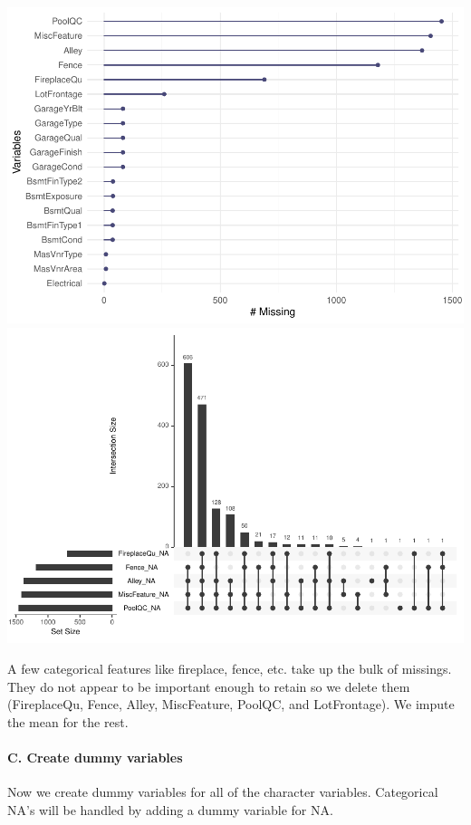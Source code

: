 \documentclass[
]{article}
\begin{document}
\includegraphics{Eric_Hirsch_621_Final_HomePrices_files/figure-latex/unnamed-chunk-4-1.pdf}
\includegraphics{Eric_Hirsch_621_Final_HomePrices_files/figure-latex/unnamed-chunk-4-2.pdf}

A few categorical features like fireplace, fence, etc. take up the bulk
of missings. They do not appear to be important enough to retain so we
delete them (FireplaceQu, Fence, Alley, MiscFeature, PoolQC, and
LotFrontage). We impute the mean for the rest.

\hypertarget{c.-create-dummy-variables}{%
\paragraph{C. Create dummy variables}\label{c.-create-dummy-variables}}

Now we create dummy variables for all of the character variables.
Categorical NA's will be handled by adding a dummy variable for NA.
\end{document}
